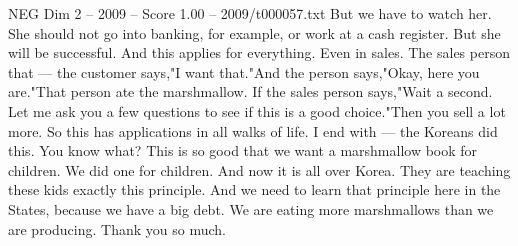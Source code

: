 \begin{textsample}{NEG Dim 2 – 2009 – Score 1.00 – 2009/t000057.txt}
But we have to watch her.
She should not go into banking, for example, or work at a cash register.
But she will be successful.
And this applies for everything.
Even in sales.
The sales person that — the customer says,"I want that."And the person says,"Okay, here you are."That person ate the marshmallow.
If the sales person says,"Wait a second.
Let me ask you a few questions to see if this is a good choice."Then you sell a lot more.
So this has applications in all walks of life.
I end with — the Koreans did this.
You know what?
This is so good that we want a marshmallow book for children.
We did one for children.
And now it is all over Korea.
They are teaching these kids exactly this principle.
And we need to learn that principle here in the States, because we have a big debt.
We are eating more marshmallows than we are producing.
Thank you so much.

\end{textsample}
